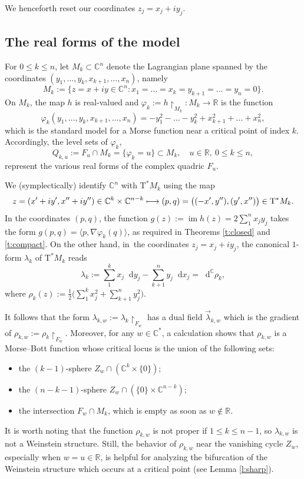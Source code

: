 \documentclass[10pt]{amsart}
\newcommand\mto{\mathchoice{\longmapsto}{\mapsto}{\mapsto}{\mapsto}}
\newcommand{\C}{{\mathbb C}}
\newcommand{\R}{{\mathbb R}}
\newcommand{\im}{\operatorname{im}}
\newcommand{\etc}{,\ldots,}
\newcommand{\sT}{\mathrm{T}^\ast}
\renewcommand{\d}{\mathop{}\!\mathrm d}
\newcommand{\dc}{\d^{\scriptscriptstyle{\C}}}
\newcommand{\dx}{\d x}
\newcommand{\dy}{\d y}
\newcommand{\prg}[1]{\langle #1 \rangle}
\newcommand{\de}{\mathrel{:=}}
\newcommand{\rst}[1]{{\upharpoonright}_{\!#1}}
\newcommand{\with}{\mathrel{:}}
\let\on\colon
\theoremstyle{plain}
\theoremstyle{definition}
\begin{document}
We henceforth reset our coordinates $z_j = x_j+iy_j$.

\smallskip

\subsection{The real forms of the model} \label{ss:locmod2}

For $0 \le k \le n$, let $M_k \subset \C^n$ denote the Lagrangian plane spanned
by the coordinates $(y_1 \etc y_k, x_{k+1} \etc x_n)$, namely
\[
M_k \de \{z = x+iy \in \C^n \with
 x_1 =\dots= x_k = y_{k+1} =\dots= y_n = 0\}.
\]
On $M_k$, the map $h$ is real-valued and $\varphi_k \de h \rst{ M_k } \on M_k
\to \R$ is the function
\[
\varphi_k (y_1 \etc y_k, x_{k+1} \etc x_n)
 = - y_1^2 -\dots- y_k^2 + x_{k+1}^2 +\dots+ x_n^2,
\]
which is the standard model for a Morse function near a critical point of index
$k$. Accordingly, the level sets of $\varphi_k$,
\[
Q_{k,u} \de F_u \cap M_k = \{\varphi_k=u\} \subset M_k, \quad
 u \in \R, \ 0 \le k \le n,
\]
represent the various real forms of the complex quadric $F_u$.

We (symplectically) identify $\C^n$ with $\sT M_k$ using the map
\[
z = (x'+iy', x''+iy'') \in \C^k \times \C^{n-k}
 \mto (p,q) = \bigl((-x',y''), (y',x'')\bigr) \in \sT M_k.
\]
In the coordinates $(p,q)$, the function $g(z) \de \im h(z) = 2 \sum_1^n x_jy_j$
takes the form $g(p,q) = \prg{p, \nabla\varphi_k(q)}$, as required in Theorems
\ref{t:closed} and \ref{t:compact}. On the other hand, in~the coordinates $z_j
= x_j+iy_j$, the canonical $1$-form $\lambda_k$ of $\sT M_k$ reads
\[
\lambda_k \de \sum_1^k x_j \dy_j - \sum_{k+1}^n y_j \dx_j = \dc\rho_k,
\]
where $\rho_k(z) \de \tfrac12 \bigl(\sum_1^k x_j^2 + \sum_{k+1}^n y_j^2\bigr)$.

It follows that the form $\lambda_{k,w} \de \lambda_k \rst{ F_w }$ has a dual
field $\vec\lambda_{k,w}$ which is the gradient of $\rho_{k,w} \de \rho_k \rst{
F_w }$. Moreover, for any $w \in \C^*$, a calculation shows that $\rho_{k,w}$ is
a Morse--Bott function whose critical locus is the union of the following sets:
\begin{itemize}
\item
the $(k-1)$-sphere $Z_w \cap (\C^k \times \{0\})$;
\item
the $(n-k-1)$-sphere $Z_w \cap (\{0\} \times \C^{n-k})$;
\item
the intersection $F_w \cap M_k$, which is empty as soon as $w \notin \R$.
\end{itemize}
It is worth noting that the function $\rho_{k,w}$ is not proper if $1 \le k \le
n-1$, so $\lambda_{k,w}$ is not a Weinstein structure. Still, the behavior of
$\rho_{k,w}$ near the vanishing cycle $Z_w$, especially when $w=u \in \R$, is
helpful for analyzing the bifurcation of the Weinstein structure which occurs at
a critical point (see Lemma \ref{l:sharp}).
\end{document}
